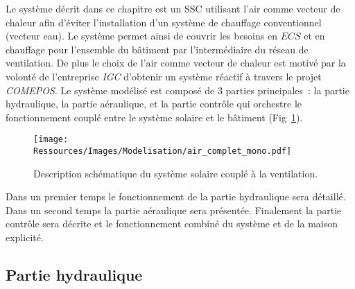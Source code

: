 Le système décrit dans ce chapitre est un SSC utilisant l’air comme vecteur de chaleur
afin d’éviter l’installation d’un système de chauffage conventionnel (vecteur eau). Le
système permet ainsi de couvrir les besoins en $ECS$ et en chauffage pour l’ensemble du
bâtiment par l’intermédiaire du réseau de ventilation. De plus le choix de l’air comme
vecteur de chaleur est motivé par la volonté de l’entreprise \emph{IGC} d’obtenir un
système réactif à travers le projet \textit{COMEPOS}.
Le système modélisé est composé de 3 parties principales~: la partie
hydraulique, la partie aéraulique, et la partie contrôle qui orchestre le fonctionnement
couplé entre le système solaire et le bâtiment (Fig~\ref{fig:air_complet_mono}).

\begin{figure}
    \begin{center}
        \texttt{[image: Ressources/Images/Modelisation/air\_complet\_mono.pdf]}
    \end{center}
    \caption{Description schématique du système solaire couplé à la ventilation.
             \label{fig:air_complet_mono}}
\end{figure}

Dans un premier temps le fonctionnement de la partie hydraulique sera détaillé. Dans un
second temps la partie aéraulique sera présentée. Finalement la partie contrôle sera
décrite et le fonctionnement combiné du système et de la maison explicité.


\subsection{Partie hydraulique} %
\label{sub:partie_hydraulique}
